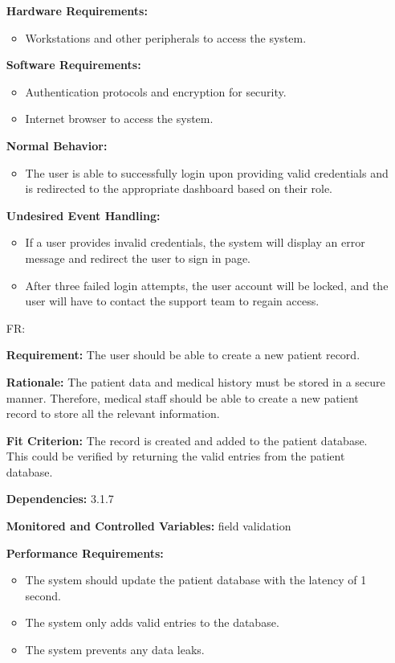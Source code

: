 \documentclass[12pt]{article}
\newcounter{reqnum} %
\begin{document}
\begin{itemize}
\textbf{Hardware Requirements:} 
\begin{itemize}
  \item Workstations and other peripherals to access the system.
\end{itemize}

\textbf{Software Requirements:} 
\begin{itemize}
  \item Authentication protocols and encryption for security. 
  \item Internet browser to access the system.
\end{itemize}

\textbf{Normal Behavior:} 
\begin{itemize}
  \item The user is able to successfully login upon providing valid credentials and is redirected to the appropriate dashboard based on their role.
\end{itemize}

\textbf{Undesired Event Handling:}
\begin{itemize}
  \item If a user provides invalid credentials, the system will display an error message and redirect the user to sign in page.
  \item After three failed login attempts, the user account will be locked, and the user will have to contact the support team to regain access.
\end{itemize}
 

\item[FR\refstepcounter{reqnum}\thereqnum \label{FR_createRecord}:]

\textbf{Requirement:} The user should be able to create a new patient record. 

\textbf{Rationale:} The patient data and medical history must be stored in a secure manner. Therefore, medical staff should be able to create a new patient record to store all the relevant information. 

\textbf{Fit Criterion:} The record is created and added to the patient database. This could be verified by returning the valid entries from the patient database.

\textbf{Dependencies:} 3.1.7

\textbf{Monitored and Controlled Variables:} field validation

\textbf{Performance Requirements:} 
\begin{itemize}
  \item The system should update the patient database with the latency of 1 second. 
  \item The system only adds valid entries to the database.
  \item The system prevents any data leaks.
\end{itemize}


\end{itemize}
\end{document}

